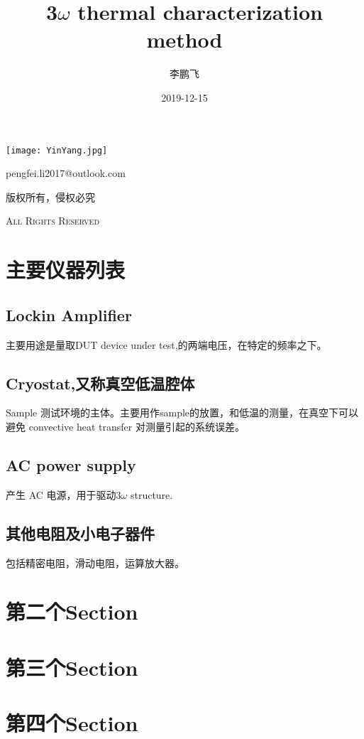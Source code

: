 \documentclass[UTF8,fancyhdr,a4paper]{ctexart}
\title{3$\omega$ thermal characterization method}
\author{李鹏飞}
\date{2019-12-15}
\begin{document}
\begin{titlepage}
\maketitle
{}
\centering
\vspace{10cm}
\texttt{[image: YinYang.jpg]}\par
\vspace{1cm}
{\huge pengfei.li2017@outlook.com}\par
\vspace{0.5cm}
{\small 版权所有，侵权必究}\par
\vspace{0.5cm}
{\scshape \small All Rights Reserved}
\end{titlepage}

\tableofcontents
{}%
\clearpage
\listoffigures
{}
\clearpage
\listoftables
{}
\clearpage

\newpage
{}

\section{主要仪器列表}
\subsection{Lockin Amplifier}
主要用途是量取DUT device under test,的两端电压，在特定的频率之下。
\subsection{Cryostat,又称真空低温腔体}
Sample 测试环境的主体。主要用作sample的放置，和低温的测量，在真空下可以避免 convective heat transfer 对测量引起的系统误差。
\subsection{AC power supply}
产生 AC 电源，用于驱动$ 3\omega$ structure.
\subsection{其他电阻及小电子器件}
包括精密电阻，滑动电阻，运算放大器。

\newpage
\section{第二个Section}

\newpage
\section{第三个Section}

\newpage
\section{第四个Section}
\end{document}
